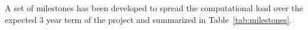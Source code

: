 


A set of milestones has been developed to spread the computational load over
the expected 3 year term of the project and summarized in  Table~\ref{tab:milestones}.  



